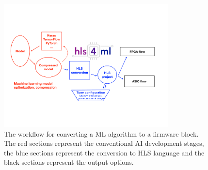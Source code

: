\begin{figure}[hbt!]
	\begin{center}
		\includegraphics[width=0.8\textwidth]{figs/hls4ml-flow-4}
		
		\caption[hls4ml workflow]{The workflow for converting a ML algorithm to a firmware block. The red sections represent the conventional AI development stages, the blue sections represent the conversion to HLS language and the black sections represent the output options.}\label{fig:hls4ml}
	\end{center}
\end{figure}

